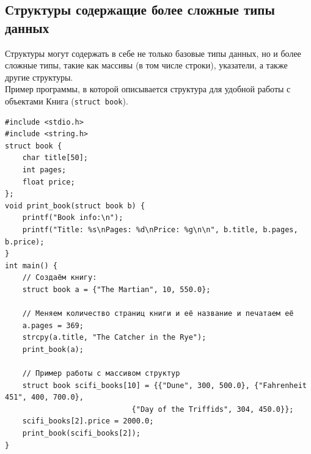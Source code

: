 \documentclass{article}
\begin{document}
\subsection*{Структуры содержащие более сложные типы данных}
Структуры могут содержать в себе не только базовые типы данных, но и более сложные типы, такие как массивы (в том числе строки), указатели, а также другие структуры.\\
Пример программы, в которой описывается структура для удобной работы с объектами Книга (\texttt{struct book}).
\begin{lstlisting}
#include <stdio.h>
#include <string.h>
struct book {
    char title[50];
    int pages;
    float price;
};
void print_book(struct book b) {
    printf("Book info:\n");
    printf("Title: %s\nPages: %d\nPrice: %g\n\n", b.title, b.pages, b.price);
}
int main() {
    // Создаём книгу:
    struct book a = {"The Martian", 10, 550.0};
    
    // Меняем количество страниц книги и её название и печатаем её
    a.pages = 369;
    strcpy(a.title, "The Catcher in the Rye");
    print_book(a);
    
    // Пример работы с массивом структур
    struct book scifi_books[10] = {{"Dune", 300, 500.0}, {"Fahrenheit 451", 400, 700.0},
							 {"Day of the Triffids", 304, 450.0}};
    scifi_books[2].price = 2000.0;
    print_book(scifi_books[2]);
}
\end{lstlisting}
\newpage
\end{document}
